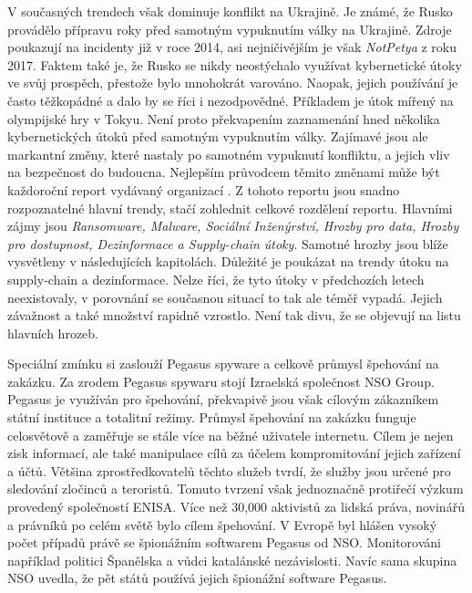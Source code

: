 V současných trendech však dominuje konflikt na Ukrajině.
Je známé, že Rusko provádělo přípravu roky před samotným vypuknutím války na Ukrajině.
Zdroje poukazují na incidenty již v roce 2014\cite{russian_cyber_usage}, asi nejničivějším je však \textit{NotPetya} z roku 2017\cite{NotPetya}.
Faktem také je, že Rusko se nikdy neostýchalo využívat kybernetické útoky ve svůj prospěch, přestože bylo mnohokrát varováno.
Naopak, jejich používání je často těžkopádné a dalo by se říci i nezodpovědné.
Příkladem je útok mířený na olympijské hry v Tokyu\cite{Tokyo_olympic_attack}.
Není proto překvapením zaznamenání hned několika kybernetických útoků před samotným vypuknutím války\cite{before_ukranian_war_attacks}.
Zajímavé jsou ale markantní změny, které nastaly po samotném vypuknutí konfliktu, a jejich vliv na bezpečnost do budoucna.
Nejlepším průvodcem těmito změnami může být každoroční report vydávaný organizací \cite{Enisa_thread_landscape}.
Z tohoto reportu jsou snadno rozpoznatelné hlavní trendy, stačí zohlednit celkové rozdělení reportu.
Hlavními zájmy jsou \textit{Ransomware, Malware, Sociální Inženýrství, Hrozby pro data,	Hrozby pro dostupnost, Dezinformace a Supply-chain útoky}.
Samotné hrozby jsou blíže vysvětleny v následujících kapitolách.
Důležité je poukázat na trendy útoku na supply-chain a dezinformace.
Nelze říci, že tyto útoky v předchozích letech neexistovaly, v porovnání se současnou situací to tak ale téměř vypadá.
Jejich závažnost a také množství rapidně vzrostlo.
Není tak divu, že se objevují na listu hlavních hrozeb.
~

Speciální zmínku si zaslouží Pegasus spyware a celkově průmysl špehování na zakázku.
Za zrodem Pegasus spywaru stojí Izraelská společnost NSO Group.
Pegasus je využíván pro špehování, překvapivě jsou však cílovým zákazníkem státní instituce a totalitní režimy.
Průmysl špehování na zakázku funguje celosvětově a zaměřuje se stále více na běžné uživatele internetu.
Cílem je nejen zisk informací, ale také manipulace cílů za účelem kompromitování jejich zařízení a účtů.
Většina zprostředkovatelů těchto služeb tvrdí, že služby jsou určené pro sledování zločinců a teroristů.
Tomuto tvrzení však jednoznačně protiřečí výzkum provedený společností \ac{ENISA}.
Více než 30,000 aktivistů za lidská práva, novinářů a právníků po celém světě bylo cílem špehování.
V Evropě byl hlášen vysoký počet případů právě se špionážním softwarem Pegasus od NSO\@.
Monitorováni například politici Španělska a vůdci katalánské nezávislosti.
Navíc sama skupina NSO uvedla, že pět států  používá jejich špionážní software Pegasus.\cite{Enisa_thread_landscape}

